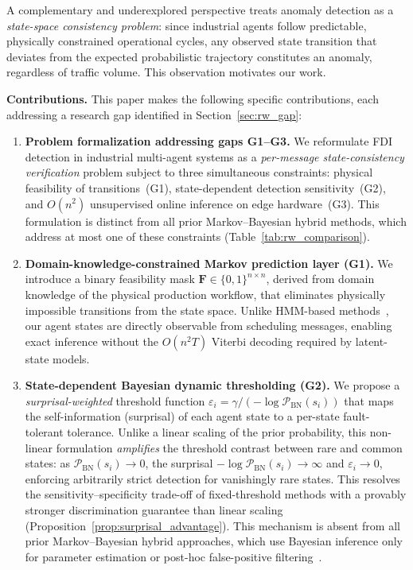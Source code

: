 \documentclass[manuscript,screen,review]{acmart}
\begin{document}
A complementary and underexplored perspective treats anomaly
detection as a \textit{state-space consistency problem}: since
industrial agents follow predictable, physically constrained
operational cycles, any observed state transition that deviates
from the expected probabilistic trajectory constitutes an anomaly,
regardless of traffic volume. This observation motivates our
work.

\textbf{Contributions.} This paper makes the following
specific contributions, each addressing a research gap
identified in Section~\ref{sec:rw_gap}:
\begin{enumerate}

\item \textbf{Problem formalization addressing gaps G1--G3.}
We reformulate FDI detection in industrial multi-agent
systems as a \emph{per-message state-consistency
verification} problem subject to three simultaneous
constraints: physical feasibility of transitions~(G1),
state-dependent detection sensitivity~(G2), and $O(n^2)$
unsupervised online inference on edge hardware~(G3). This
formulation is distinct from all prior Markov--Bayesian
hybrid methods, which address at most one of these
constraints (Table~\ref{tab:rw_comparison}).

\item \textbf{Domain-knowledge-constrained Markov prediction
layer (G1).}
We introduce a binary feasibility mask
$\mathbf{F} \in \{0,1\}^{n \times n}$, derived from
domain knowledge of the physical production workflow, that
eliminates physically impossible transitions from the state
space. Unlike HMM-based methods~\cite{ref_ourston}, our
agent states are directly observable from scheduling
messages, enabling exact inference without the $O(n^2 T)$
Viterbi decoding required by latent-state models.

\item \textbf{State-dependent Bayesian dynamic thresholding
(G2).}
We propose a \emph{surprisal-weighted} threshold function
\(\varepsilon_i = \gamma / {(-\log \mathcal{P}_{\mathrm{BN}}(s_i))}\)
that maps the self-information (surprisal) of each agent
state to a per-state fault-tolerant tolerance.
Unlike a linear scaling of the prior probability, this
non-linear formulation \emph{amplifies} the threshold
contrast between rare and common states: as
\(\mathcal{P}_{\mathrm{BN}}(s_i) \to 0\),
the surprisal \(-\log \mathcal{P}_{\mathrm{BN}}(s_i) \to \infty\)
and \(\varepsilon_i \to 0\), enforcing arbitrarily strict
detection for vanishingly rare states.
This resolves the sensitivity--specificity trade-off of
fixed-threshold methods with a provably stronger
discrimination guarantee than linear scaling
(Proposition~\ref{prop:surprisal_advantage}).
This mechanism is absent from all prior Markov--Bayesian
hybrid approaches, which use Bayesian inference only for
parameter estimation or post-hoc false-positive
filtering~\cite{ref21,ref22}.


\end{enumerate}
\end{document}
